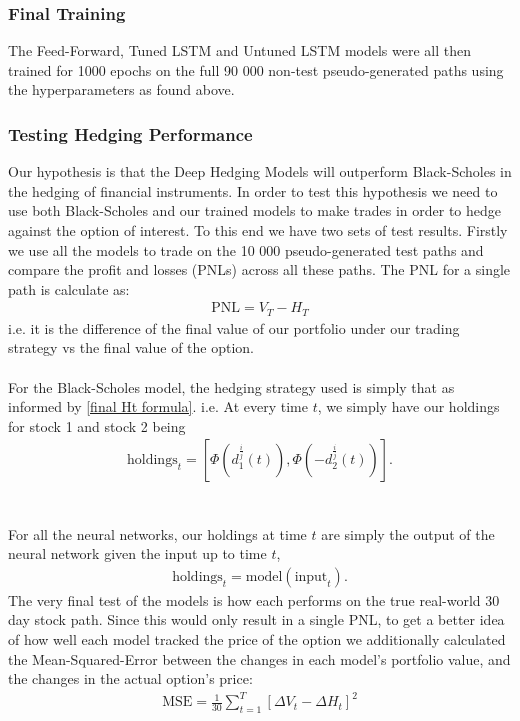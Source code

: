 \documentclass{article}
\theoremstyle{definition}
\begin{document}
\subsubsection{Final Training}
The Feed-Forward, Tuned LSTM and Untuned LSTM models were all then trained for 1000 epochs on the full 90 000 non-test pseudo-generated paths using the hyperparameters as found above.

\subsubsection{Testing Hedging Performance}
Our hypothesis is that the Deep Hedging Models will outperform Black-Scholes in the hedging of financial instruments. In order to test this hypothesis we need to use both Black-Scholes and our trained models to make trades in order to hedge against the option of interest. To this end we have two sets of test results. Firstly we use all the models to trade on the 10 000 pseudo-generated test paths and compare the profit and losses (PNLs) across all these paths. The PNL for a single path is calculate as:
\begin{align}
    \text{PNL} = V_T-H_T
\end{align}
i.e. it is the difference of the final value of our portfolio under our trading strategy vs the final value of the option.\\\\
For the Black-Scholes model, the hedging strategy used is simply that as informed by \ref{final Ht formula}. i.e. At every time $t$, we simply have our holdings for stock 1 and stock 2 being
\begin{align}
    \text{holdings}_{t} = \left[\Phi\left(d_1^{\frac{i}{j}}(t)\right), \Phi\left(-d_2^{\frac{i}{j}}(t)\right)\right].
\end{align}\\\\
For all the neural networks, our holdings at time $t$ are simply the output of the neural network given the input up to time $t$, 
\begin{align}
    \text{holdings}_{t} = \text{model}(\text{input}_{t}).
\end{align}
The very final test of the models is how each performs on the true real-world 30 day stock path. Since this would only result in a single PNL, to get a better idea of how well each model tracked the price of the option we additionally calculated the Mean-Squared-Error between the changes in each model's portfolio value, and the changes in the actual option's price:
\begin{align}
    \text{MSE} = \frac{1}{30}\sum_{t=1}^T \left[\Delta V_t - \Delta H_t\right]^2
\end{align}
\newpage
\end{document}
